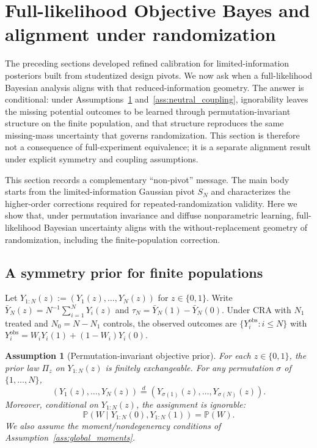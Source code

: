 \documentclass[aos]{imsart}
\newtheorem{assumption}{Assumption}
\theoremstyle{definition}
\theoremstyle{plain}
\newcommand{\Prb}{\mathbb{P}}
\newcommand{\SN}{S_N}
\begin{document}
\section{Full-likelihood Objective Bayes and alignment under randomization}\label{sec:full_likelihood_forcing}

The preceding sections developed refined calibration for limited-information posteriors built from studentized design pivots. We now ask when a full-likelihood Bayesian analysis aligns with that reduced-information geometry. The answer is conditional: under Assumptions~\ref{ass:exchangeable_prior} and~\ref{ass:neutral_coupling}, ignorability leaves the missing potential outcomes to be learned through permutation-invariant structure on the finite population, and that structure reproduces the same missing-mass uncertainty that governs randomization. This section is therefore not a consequence of full-experiment equivalence; it is a separate alignment result under explicit symmetry and coupling assumptions.

This section records a complementary ``non-pivot'' message.
The main body starts from the limited-information Gaussian pivot $\SN$ and
characterizes the higher-order corrections required for repeated-randomization validity.
Here we show that, under permutation invariance and diffuse nonparametric learning,
full-likelihood Bayesian uncertainty aligns with the without-replacement geometry of
randomization, including the finite-population correction.

\subsection{A symmetry prior for finite populations}

Let $Y_{1:N}(z):=(Y_1(z),\dots,Y_N(z))$ for $z\in\{0,1\}$.
Write $\bar Y_N(z)=N^{-1}\sum_{i=1}^N Y_i(z)$ and $\tau_N=\bar Y_N(1)-\bar Y_N(0)$.
Under CRA with $N_1$ treated and $N_0=N-N_1$ controls, the observed outcomes are
$\{Y_i^{\mathrm{obs}}: i\le N\}$ with $Y_i^{\mathrm{obs}}=W_iY_i(1)+(1-W_i)Y_i(0)$.

\begin{assumption}[Permutation-invariant objective prior]\label{ass:exchangeable_prior}
For each $z\in\{0,1\}$, the prior law $\Pi_z$ on $Y_{1:N}(z)$ is finitely exchangeable.
For any permutation $\sigma$ of $\{1,\dots,N\}$,
\[
(Y_1(z),\dots,Y_N(z))\stackrel{d}{=}(Y_{\sigma(1)}(z),\dots,Y_{\sigma(N)}(z)).
\]
Moreover, conditional on $Y_{1:N}(z)$, the assignment is ignorable:
\[
\Prb(W\mid Y_{1:N}(0),Y_{1:N}(1))=\Prb(W).
\]
We also assume the moment/nondegeneracy conditions of Assumption~\ref{ass:global_moments}.
\end{assumption}
\end{document}
